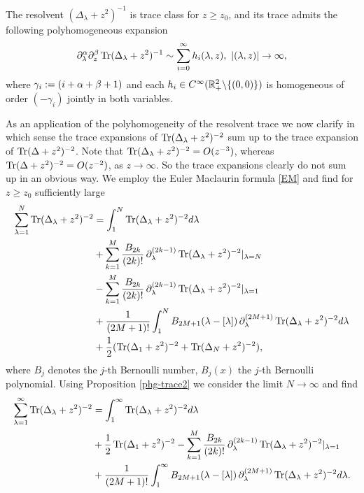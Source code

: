 \begin{prop}
\label{phg-trace2}
The resolvent $(\Delta_\lambda+z^2)^{-1}$ is trace class for $z\geq z_0$, 
and its trace admits the following polyhomogeneous expansion 
\begin{align*}
\partial_\lambda^{\A}\partial_z^{\beta}
\Tr(\Delta_\lambda+z^2)^{-1} \sim \sum_{i=0}^\infty h_i (\lambda,z), \ |(\lambda,z)| \to \infty,
\end{align*}
where $\gamma_i:=(i+\mathrm{\alpha}+\beta +1)$ and each $h_i\in C^{\infty}(\mathbb{R}^2_+\backslash \{(0,0)\})$
is homogeneous of order $(-\gamma_i)$ jointly in both variables. 
\end{prop}

As an application of the polyhomogeneity of the resolvent trace 
we now clarify in which sense the trace expansions 
of $\operatorname{Tr}(\Delta_\lambda+z^2)^{-2}$ sum up to the trace expansion 
of $\operatorname{Tr}(\Delta+z^2)^{-2}$. Note that $\operatorname{Tr}(\Delta_\lambda+z^2)^{-2}=O(z^{-3})$, 
whereas $\operatorname{Tr}(\Delta+z^2)^{-2}=O(z^{-2})$, as $z\to \infty$. 
So the trace expansions clearly do not sum up in an obvious way.
We employ the Euler Maclaurin formula \eqref{EM} 
and find for $z\geq z_0$ sufficiently large
\begin{equation}
\begin{split}
\sum_{\lambda=1}^{N} \operatorname{Tr}(\Delta_\lambda+z^2)^{-2} &=
\int_1^N \operatorname{Tr}(\Delta_\lambda+z^2)^{-2} d\lambda \\
&+ \sum_{k=1}^M \frac{B_{2k}}{(2k)!} \,
\partial_\lambda^{(2k-1)}\operatorname{Tr}(\Delta_\lambda+z^2)^{-2}|_{\lambda=N} \\
&- \sum_{k=1}^M \frac{B_{2k}}{(2k)!}  \,
\partial_\lambda^{(2k-1)}\operatorname{Tr}(\Delta_\lambda+z^2)^{-2}|_{\lambda=1} \\ 
&+ \frac{1}{(2M+1)!} \int_1^N B_{2M+1}(\lambda-[\lambda]) \,
\partial_\lambda^{(2M+1)}\operatorname{Tr}(\Delta_\lambda+z^2)^{-2} d\lambda \\ &+ 
\frac{1}{2}(\operatorname{Tr}(\Delta_1+z^2)^{-2}+\operatorname{Tr}(\Delta_N+z^2)^{-2}),
\end{split}
\end{equation}
where $B_j$ denotes the $j$-th Bernoulli number, $B_j(x)$ the $j$-th Bernoulli 
polynomial. Using Proposition \ref{phg-trace2} we consider the limit $N\to \infty$ and find
\begin{equation}
\label{EM2}
\begin{split}
\sum_{\lambda=1}^{\infty} \operatorname{Tr}(\Delta_\lambda+z^2)^{-2} &=
\int_1^\infty \operatorname{Tr}(\Delta_\lambda+z^2)^{-2} d\lambda \\
&+ \frac{1}{2}\operatorname{Tr}(\Delta_1+z^2)^{-2} - \sum_{k=1}^M \frac{B_{2k}}{(2k)!} \, 
\partial_\lambda^{(2k-1)}\operatorname{Tr}(\Delta_\lambda+z^2)^{-2}|_{\lambda=1} \\ 
&+ \frac{1}{(2M+1)!} \int_1^\infty B_{2M+1}(\lambda-[\lambda]) \,
\partial_\lambda^{(2M+1)}\operatorname{Tr}(\Delta_\lambda+z^2)^{-2} d\lambda.
\end{split}
\end{equation}
